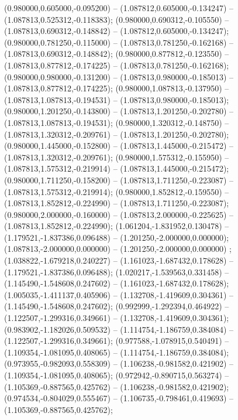  (0.980000,0.605000,-0.095200) -- (1.087812,0.605000,-0.134247) -- (1.087813,0.525312,-0.118383);
 (0.980000,0.690312,-0.105550) -- (1.087813,0.690312,-0.148842) -- (1.087812,0.605000,-0.134247);
 (0.980000,0.781250,-0.115000) -- (1.087813,0.781250,-0.162168) -- (1.087813,0.690312,-0.148842);
 (0.980000,0.877812,-0.123550) -- (1.087813,0.877812,-0.174225) -- (1.087813,0.781250,-0.162168);
 (0.980000,0.980000,-0.131200) -- (1.087813,0.980000,-0.185013) -- (1.087813,0.877812,-0.174225);
 (0.980000,1.087813,-0.137950) -- (1.087813,1.087813,-0.194531) -- (1.087813,0.980000,-0.185013);
 (0.980000,1.201250,-0.143800) -- (1.087813,1.201250,-0.202780) -- (1.087813,1.087813,-0.194531);
 (0.980000,1.320312,-0.148750) -- (1.087813,1.320312,-0.209761) -- (1.087813,1.201250,-0.202780);
 (0.980000,1.445000,-0.152800) -- (1.087813,1.445000,-0.215472) -- (1.087813,1.320312,-0.209761);
 (0.980000,1.575312,-0.155950) -- (1.087813,1.575312,-0.219914) -- (1.087813,1.445000,-0.215472);
 (0.980000,1.711250,-0.158200) -- (1.087813,1.711250,-0.223087) -- (1.087813,1.575312,-0.219914);
 (0.980000,1.852812,-0.159550) -- (1.087813,1.852812,-0.224990) -- (1.087813,1.711250,-0.223087);
 (0.980000,2.000000,-0.160000) -- (1.087813,2.000000,-0.225625) -- (1.087813,1.852812,-0.224990);
 (1.061204,-1.831952,0.130478) -- (1.179521,-1.837386,0.096488) -- (1.201250,-2.000000,0.000000);
 (1.087813,-2.000000,0.000000) -- (1.201250,-2.000000,0.000000) ;
 (1.038822,-1.679218,0.240227) -- (1.161023,-1.687432,0.178628) -- (1.179521,-1.837386,0.096488);
 (1.020217,-1.539563,0.331458) -- (1.145490,-1.548608,0.247602) -- (1.161023,-1.687432,0.178628);
 (1.005035,-1.411137,0.405906) -- (1.132708,-1.419609,0.304361) -- (1.145490,-1.548608,0.247602);
 (0.992999,-1.292394,0.464922) -- (1.122507,-1.299316,0.349661) -- (1.132708,-1.419609,0.304361);
 (0.983902,-1.182026,0.509532) -- (1.114754,-1.186759,0.384084) -- (1.122507,-1.299316,0.349661);
 (0.977588,-1.078915,0.540491) -- (1.109354,-1.081095,0.408065) -- (1.114754,-1.186759,0.384084);
 (0.973955,-0.982093,0.558309) -- (1.106238,-0.981582,0.421902) -- (1.109354,-1.081095,0.408065);
 (0.972942,-0.890715,0.563274) -- (1.105369,-0.887565,0.425762) -- (1.106238,-0.981582,0.421902);
 (0.974534,-0.804029,0.555467) -- (1.106735,-0.798461,0.419693) -- (1.105369,-0.887565,0.425762);
